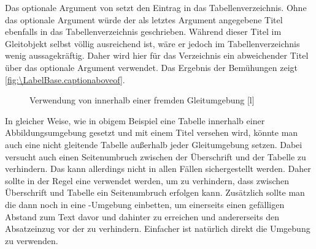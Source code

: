 \begin{Example}
  Das optionale Argument von  setzt den Eintrag in das
  Tabellenverzeichnis. Ohne das optionale Argument würde der als letztes
  Argument angegebene Titel ebenfalls in das Tabellenverzeichnis
  geschrieben. Während dieser Titel im Gleitobjekt selbst völlig ausreichend
  ist, wäre er jedoch im Tabellenverzeichnis wenig aussagekräftig. Daher wird
  hier für das Verzeichnis ein abweichender Titel über das optionale Argument
  verwendet. Das Ergebnis der Bemühungen zeigt
  \autoref{fig:\LabelBase.captionaboveof}.%
%
\begin{figure}
  \setcapindent{0pt}%
  \begin{captionbeside}
    {\hspace{0pt plus 1ex}Verwendung von  innerhalb einer
      fremden Gleitumgebung\label{fig:\LabelBase.captionaboveof}}
    [l]
  \begin{minipage}[b]{.66\linewidth}%
  \end{minipage}%
  \end{captionbeside}%
\end{figure}%
\end{Example}%
In gleicher Weise, wie in obigem Beispiel eine Tabelle innerhalb einer
Abbildungsumgebung gesetzt und mit einem Titel versehen wird, könnte man auch
eine nicht gleitende Tabelle außerhalb jeder Gleitumgebung
setzen. Dabei versucht  auch einen Seitenumbruch zwischen
der Überschrift und der Tabelle zu verhindern. Das kann allerdings nicht in
allen Fällen sichergestellt werden. Daher sollte in der Regel eine
 verwendet werden, um zu verhindern, dass zwischen
Überschrift und Tabelle ein Seitenumbruch erfolgen kann. Zusätzlich sollte man
die  dann noch in eine -Umgebung
einbetten, um einerseits einen gefälligen Abstand zum Text davor und dahinter
zu erreichen und andererseits den Absatzeinzug vor der 
zu verhindern. Einfacher ist natürlich direkt die Umgebung
 zu verwenden.%
\EndIndexGroup


